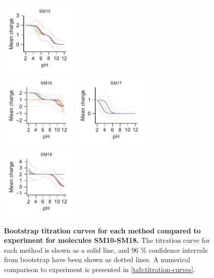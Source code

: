 \documentclass[9pt,lineno,final]{elife}
\begin{document}
\begin{figure}[H]
	\includegraphics[width=0.33\textwidth]{Reports/overview-virtual-titration-SM15.pdf}	 \\
	\includegraphics[width=0.33\textwidth]{Reports/overview-virtual-titration-SM16.pdf}
	\includegraphics[width=0.33\textwidth]{Reports/overview-virtual-titration-SM17.pdf}
	\includegraphics[width=0.33\textwidth]{Reports/overview-virtual-titration-SM18.pdf}	 \\
	\caption{{\bf Bootstrap titration curves for each method compared to experiment for molecules SM10-SM18.} The titration curve for each method is shown as a solid line, and 96 \% confidence intervals from bootstrap have been shown as dotted lines. A numerical comparison to experiment is presented in \cref{tab:titration-curves}.
	\label{fig:charge-curves2}}

\end{figure}
    
\end{document}
